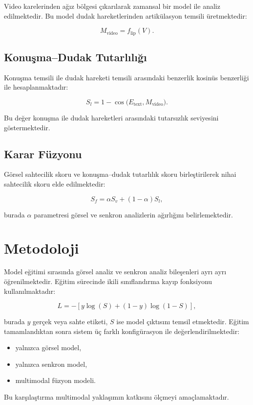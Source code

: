\documentclass[conference]{IEEEtran}
\begin{document}
Video karelerinden ağız bölgesi çıkarılarak zamansal bir model ile analiz edilmektedir. Bu model dudak hareketlerinden artikülasyon temsili üretmektedir:

\[
M_{\text{video}} = f_{\text{lip}}(V).
\]

\subsection{Konuşma--Dudak Tutarlılığı}

Konuşma temsili ile dudak hareketi temsili arasındaki benzerlik kosinüs benzerliği ile hesaplanmaktadır:

\[
S_l = 1 - \cos\bigl(E_{\text{text}}, M_{\text{video}}\bigr).
\]

Bu değer konuşma ile dudak hareketleri arasındaki tutarsızlık seviyesini göstermektedir.

\subsection{Karar Füzyonu}

Görsel sahtecilik skoru ve konuşma--dudak tutarlılık skoru birleştirilerek nihai sahtecilik skoru elde edilmektedir:

\[
S_f = \alpha S_v + (1-\alpha) S_l,
\]

burada $\alpha$ parametresi görsel ve senkron analizlerin ağırlığını belirlemektedir.

\section{Metodoloji}

Model eğitimi sırasında görsel analiz ve senkron analiz bileşenleri ayrı ayrı öğrenilmektedir. Eğitim sürecinde ikili sınıflandırma kayıp fonksiyonu kullanılmaktadır:

\[
L = -\left[y \log(S) + (1-y)\log(1-S)\right],
\]

burada $y$ gerçek veya sahte etiketi, $S$ ise model çıktısını temsil etmektedir. Eğitim tamamlandıktan sonra sistem üç farklı konfigürasyon ile değerlendirilmektedir:

\begin{itemize}
  \item yalnızca görsel model,
  \item yalnızca senkron model,
  \item multimodal füzyon modeli.
\end{itemize}

Bu karşılaştırma multimodal yaklaşımın katkısını ölçmeyi amaçlamaktadır.
\end{document}
